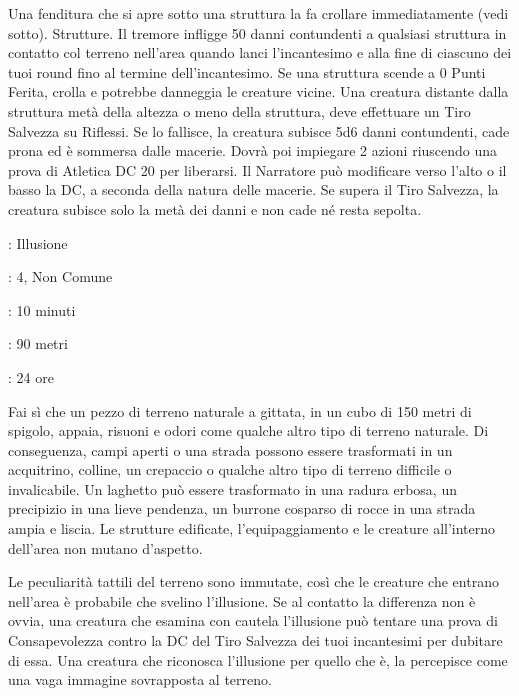 \begin{multicols}{2}
Una fenditura che si apre sotto una struttura la fa crollare immediatamente (vedi sotto). Strutture. Il tremore infligge 50 danni contundenti a qualsiasi struttura in contatto col terreno nell'area quando lanci l'incantesimo e alla fine di ciascuno dei tuoi round fino al termine dell'incantesimo. Se una struttura scende a 0 Punti Ferita, crolla e potrebbe danneggia le creature vicine. Una creatura distante dalla struttura metà della altezza o meno della struttura, deve effettuare un Tiro Salvezza su Riflessi. Se lo fallisce, la creatura subisce 5d6 danni contundenti, cade prona ed è sommersa dalle macerie. Dovrà poi impiegare 2 azioni riuscendo una prova di Atletica DC 20 per liberarsi. Il Narratore può modificare verso l'alto o il basso la DC, a seconda della natura delle macerie. Se supera il Tiro Salvezza, la creatura subisce solo la metà dei danni e non cade né resta sepolta.

\noindent\colorbox{OBSSgold!10}{
\begin{minipage}{0.95\linewidth}
\begin{description}[noitemsep, topsep=0pt, parsep=0pt, partopsep=0pt, leftmargin=0cm, labelwidth=1.3cm]
	\item[\textbf{Lista}]: Illusione
	\item[\textbf{Livello}]: 4, Non Comune
	\item[\textbf{Lancio}]: 10 minuti
	\item[\textbf{Gittata}]: 90 metri
	\item[\textbf{Durata}]: 24 ore
\end{description}
\end{minipage}}\smallskip

Fai sì che un pezzo di terreno naturale a gittata, in un cubo di 150 metri di spigolo, appaia, risuoni e odori come qualche altro tipo di terreno naturale. Di conseguenza, campi aperti o una strada possono essere trasformati in un acquitrino, colline, un crepaccio o qualche altro tipo di terreno difficile o invalicabile. Un laghetto può essere trasformato in una radura erbosa, un precipizio in una lieve pendenza, un burrone cosparso di rocce in una strada ampia e liscia. Le strutture edificate, l'equipaggiamento e le creature all'interno dell'area non mutano d'aspetto.

Le peculiarità tattili del terreno sono immutate, così che le creature che entrano nell'area è probabile che svelino l'illusione. Se al contatto la differenza non è ovvia, una creatura che esamina con cautela l'illusione può tentare una prova di Consapevolezza contro la DC del Tiro Salvezza dei tuoi incantesimi per dubitare di essa. Una creatura che riconosca l'illusione per quello che è, la percepisce come una vaga immagine sovrapposta al terreno.


\end{multicols}

